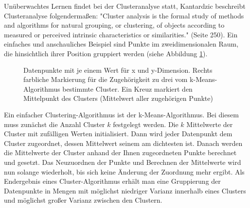 \documentclass[
	12pt,
	a4paper,
	BCOR10mm,
	DIV14,
	listof=totoc,
	bibliography=totoc,
	headsepline
]{scrreprt}
\begin{document}
Unüberwachtes Lernen findet bei der Clusteranalyse statt, Kantardzic beschreibt Clusteranalyse folgendermaßen: "Cluster analysis is the formal study of methods and algorithms for natural grouping, or clustering, of objects according to measured or perceived intrinsic characteristics or similarities." \cite{kantardzic2011data} (Seite 250). Ein einfaches und anschauliches Beispiel sind Punkte im zweidimensionalen Raum, die hinsichtlich ihrer Position gruppiert werden (siehe Abbildung \ref{fig:clustering_beispiel}).

\begin{figure}
	\hfill
	\caption{Datenpunkte mit je einem Wert für x und y-Dimension. Rechts farbliche Markierung für die Zugehörigkeit zu drei vom k-Means-Algorithmus bestimmte Cluster. Ein Kreuz markiert den Mittelpunkt des Clusters (Mittelwert aller zugehörigen Punkte)}
	\label{fig:clustering_beispiel}
\end{figure} 

Ein einfacher Clustering-Algorithmus ist der k-Means-Algorithmus. Bei diesem muss zunächst die Anzahl Cluster $k$ festgelegt werden. Die $k$ Mittelwerte der Cluster mit zufälligen Werten initialisiert. Dann wird jeder Datenpunkt dem Cluster zugeordnet, dessen Mittelwert seinem am dichtesten ist. Danach werden die Mittelwerte der Cluster anhand der Ihnen zugeordneten Punkte berechnet und gesetzt. Das Neuzuordnen der Punkte und Berechnen der Mittelwerte wird nun solange wiederholt, bis sich keine Änderung der Zuordnung mehr ergibt. Als Endergebnis eines Cluster-Algorithmus erhält man eine Gruppierung der Datenpunkte in Mengen mit möglichst niedriger Varianz innerhalb eines Clusters und möglichst großer Varianz zwischen den Clustern.
\end{document}
